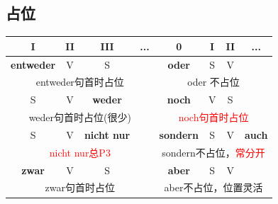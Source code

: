 \subsection{占位}
\begin{center}
    \begin{tabular}{|c|c|c|c|c|c|c|c|}
        \hline
        \rowcolor{gray}
        I                                                   & II                                                    & III                & ... & 0                & I & II & ...           \\
        \hline
        \textbf{entweder}                                   & V                                                     & S                  &     & \textbf{oder}    & S & V  &               \\
        \hline
        \multicolumn{4}{|c|}{entweder句首时占位}                 & \multicolumn{4}{|c|}{oder 不占位}                                                                                               \\
        \hhline{|========|}
        S                                                   & V                                                     & \textbf{weder}     &     & \textbf{noch}    & V & S  &               \\
        \hline
        \multicolumn{4}{|c|}{weder句首时占位(很少)}                & \multicolumn{4}{|c|}{\textcolor{red}{noch句首时占位}}                                                                             \\
        \hhline{|========|}
        S                                                   & V                                                     & \textbf{nicht nur} &     & \textbf{sondern} & S & V  & \textbf{auch} \\
        \hline
        \multicolumn{4}{|c|}{\textcolor{red}{nicht nur总P3}} & \multicolumn{4}{|c|}{sondern不占位，\textcolor{red}{常分开}}                                                                        \\
        \hhline{|========|}
        \textbf{zwar}                                       & V                                                     & S                  &     & \textbf{aber}    & S & V  &               \\
        \hline
        \multicolumn{4}{|c|}{zwar句首时占位}                     & \multicolumn{4}{|c|}{aber不占位，位置灵活}                                                                                           \\
        \hline
    \end{tabular}
\end{center}

